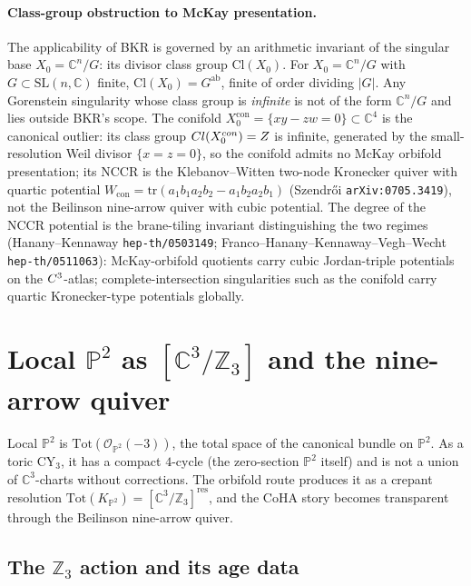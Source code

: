 \paragraph{Class-group obstruction to McKay presentation.}
The applicability of BKR is governed by an arithmetic invariant of the singular base $X_0 = \mathbb{C}^n/G$: its divisor class group $\mathrm{Cl}(X_0)$. For $X_0 = \mathbb{C}^n/G$ with $G \subset \mathrm{SL}(n, \mathbb{C})$ finite, $\mathrm{Cl}(X_0) = G^{\mathrm{ab}}$, finite of order dividing $|G|$. Any Gorenstein singularity whose class group is \emph{infinite} is not of the form $\mathbb{C}^n/G$ and lies outside BKR's scope. The conifold $X_0^{\mathrm{con}} = \{xy - zw = 0\} \subset \mathbb{C}^4$ is the canonical outlier: its class group $Cl(X_0^{con}) = Z$ is infinite, generated by the small-resolution Weil divisor $\{x = z = 0\}$, so the conifold admits no McKay orbifold presentation; its NCCR is the Klebanov--Witten two-node Kronecker quiver with quartic potential $W_{\mathrm{con}} = \mathrm{tr}(a_1 b_1 a_2 b_2 - a_1 b_2 a_2 b_1)$ (Szendr\H{o}i \texttt{arXiv:0705.3419}), not the Beilinson nine-arrow quiver with cubic potential. The degree of the NCCR potential is the brane-tiling invariant distinguishing the two regimes (Hanany--Kennaway \texttt{hep-th/0503149}; Franco--Hanany--Kennaway--Vegh--Wecht \texttt{hep-th/0511063}): McKay-orbifold quotients carry cubic Jordan-triple potentials on the $C^3$-atlas; complete-intersection singularities such as the conifold carry quartic Kronecker-type potentials globally.

\section{Local \texorpdfstring{$\mathbb{P}^2$}{P2} as \texorpdfstring{$[\mathbb{C}^3/\mathbb{Z}_3]$}{[C3/Z3]} and the nine-arrow quiver}
\label{sec:local-P2-orbifold}

Local $\mathbb{P}^2$ is $\mathrm{Tot}(\mathcal{O}_{\mathbb{P}^2}(-3))$, the total space of the canonical bundle on $\mathbb{P}^2$. As a toric CY$_3$, it has a compact $4$-cycle (the zero-section $\mathbb{P}^2$ itself) and is not a union of $\mathbb{C}^3$-charts without corrections. The orbifold route produces it as a crepant resolution $\mathrm{Tot}(K_{\mathbb{P}^2}) = [\mathbb{C}^3/\mathbb{Z}_3]^{\mathrm{res}}$, and the CoHA story becomes transparent through the Beilinson nine-arrow quiver.

\subsection{The \texorpdfstring{$\mathbb{Z}_3$}{Z3} action and its age data}
\label{subsec:Z3-action}

